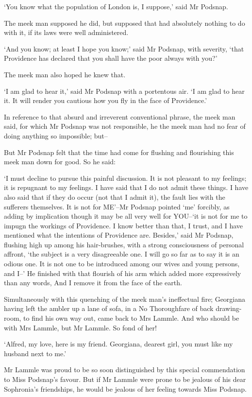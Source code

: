 ‘You know what the population of London is, I suppose,’ said Mr Podsnap.

The meek man supposed he did, but supposed that had absolutely nothing
to do with it, if its laws were well administered.

‘And you know; at least I hope you know;’ said Mr Podsnap, with
severity, ‘that Providence has declared that you shall have the poor
always with you?’

The meek man also hoped he knew that.

‘I am glad to hear it,’ said Mr Podsnap with a portentous air. ‘I am
glad to hear it. It will render you cautious how you fly in the face of
Providence.’

In reference to that absurd and irreverent conventional phrase, the meek
man said, for which Mr Podsnap was not responsible, he the meek man had
no fear of doing anything so impossible; but--

But Mr Podsnap felt that the time had come for flushing and flourishing
this meek man down for good. So he said:

‘I must decline to pursue this painful discussion. It is not pleasant to
my feelings; it is repugnant to my feelings. I have said that I do not
admit these things. I have also said that if they do occur (not that I
admit it), the fault lies with the sufferers themselves. It is not for
ME’--Mr Podsnap pointed ‘me’ forcibly, as adding by implication though
it may be all very well for YOU--‘it is not for me to impugn the
workings of Providence. I know better than that, I trust, and I have
mentioned what the intentions of Providence are. Besides,’ said
Mr Podsnap, flushing high up among his hair-brushes, with a strong
consciousness of personal affront, ‘the subject is a very disagreeable
one. I will go so far as to say it is an odious one. It is not one to be
introduced among our wives and young persons, and I--’ He finished with
that flourish of his arm which added more expressively than any words,
And I remove it from the face of the earth.

Simultaneously with this quenching of the meek man’s ineffectual fire;
Georgiana having left the ambler up a lane of sofa, in a No Thoroughfare
of back drawing-room, to find his own way out, came back to Mrs Lammle.
And who should be with Mrs Lammle, but Mr Lammle. So fond of her!

‘Alfred, my love, here is my friend. Georgiana, dearest girl, you must
like my husband next to me.’

Mr Lammle was proud to be so soon distinguished by this special
commendation to Miss Podsnap’s favour. But if Mr Lammle were prone to be
jealous of his dear Sophronia’s friendships, he would be jealous of her
feeling towards Miss Podsnap.

